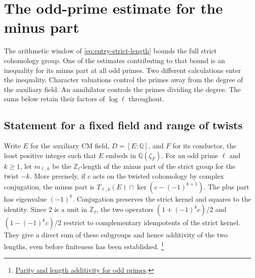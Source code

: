 \section{The odd-prime estimate for the minus part}
\label{sec:odd-prime-minus}

The arithmetic window of \eqref{eq:entry-strict-length} bounds the full
strict cohomology group. One of the estimates contributing to that
bound is an inequality for its minus part at all odd primes. Two
different calculations enter the inequality. Character valuations
control the primes away from the degree of the auxiliary field. An
annihilator controls the primes dividing the degree. The sums below
retain their factors of \(\log\ell\) throughout.

\subsection{Statement for a fixed field and range of twists}

Write \(E\) for the auxiliary CM field, \(D=[E:\mathbb Q]\), and
\(F\) for its conductor, the least positive integer such that \(E\)
embeds in \(\mathbb Q(\zeta_F)\). For an odd prime \(\ell\) and
\(k\ge1\), let \(m_{\ell,k}\) be the \(\mathbb Z_\ell\)-length of the
minus part of the strict group for the twist \(-k\). More precisely,
if \(c\) acts on the twisted cohomology by complex conjugation, the
minus part is \(T_{\ell,k}(E)\cap\ker(c-(-1)^{k+1})\). The plus part
has eigenvalue \((-1)^k\). Conjugation preserves the strict kernel and
squares to the identity. Since \(2\) is a unit in \(\mathbb Z_\ell\),
the two operators \((1+(-1)^kc)/2\) and \((1-(-1)^kc)/2\) restrict to
complementary idempotents of the strict kernel. They give a direct sum
of these subgroups and hence additivity of the two lengths, even
before finiteness has been established.
\footnote{\href{https://github.com/Deicyde/riemann-hypothesis/blob/40e56bab/src/Development/AutomorphicArithmetic/AutomorphicVarieties/LengthEqAddEigen.lean\#L68-L103}{Parity and length additivity for odd primes}.}

